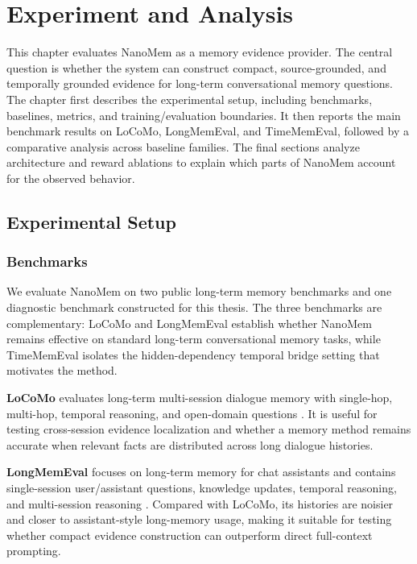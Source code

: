 \chapter{Experiment and Analysis}
\label{chap:experiment-analysis}
\label{chap:results}

This chapter evaluates NanoMem as a memory evidence provider. The central
question is whether the system can construct compact, source-grounded, and
temporally grounded evidence for long-term conversational memory questions. The
chapter first describes the experimental setup, including benchmarks,
baselines, metrics, and training/evaluation boundaries. It then reports the main
benchmark results on LoCoMo, LongMemEval, and TimeMemEval, followed by a
comparative analysis across baseline families. The final sections analyze
architecture and reward ablations to explain which parts of NanoMem account for
the observed behavior.

\section{Experimental Setup}
\label{sec:experiment-setup}

\subsection{Benchmarks}
\label{subsec:experiment-benchmarks}

We evaluate NanoMem on two public long-term memory benchmarks and one diagnostic
benchmark constructed for this thesis. The three benchmarks are complementary:
LoCoMo and LongMemEval establish whether NanoMem remains effective on standard
long-term conversational memory tasks, while TimeMemEval isolates the
hidden-dependency temporal bridge setting that motivates the method.

\textbf{LoCoMo} evaluates long-term multi-session dialogue memory with
single-hop, multi-hop, temporal reasoning, and open-domain questions
\cite{maharana2024locomo}. It is useful for testing cross-session evidence
localization and whether a memory method remains accurate when relevant facts
are distributed across long dialogue histories.

\textbf{LongMemEval} focuses on long-term memory for chat assistants and
contains single-session user/assistant questions, knowledge updates, temporal
reasoning, and multi-session reasoning \cite{wu2024longmemeval}. Compared with
LoCoMo, its histories are noisier and closer to assistant-style long-memory
usage, making it suitable for testing whether compact evidence construction can
outperform direct full-context prompting.


